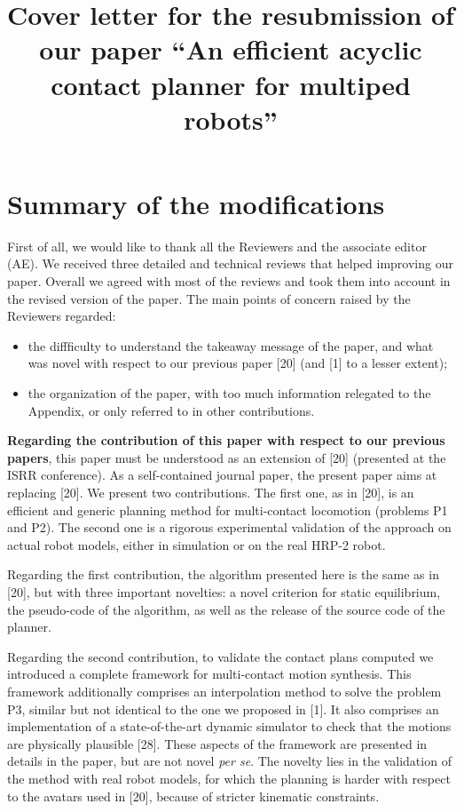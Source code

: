 \documentclass[a4paper]{article}
\author {}
\title {Cover letter for the resubmission of our paper ``An efficient acyclic contact planner for multiped robots''}
\date {}
\begin{document}
\maketitle

\section{Summary of the modifications}

First of all, we would like to thank all the Reviewers and the associate editor (AE).
We received three detailed and technical reviews that helped improving our paper.
Overall we agreed with most of the reviews and took them into account in the revised version of the paper.
The main points of concern raised by the Reviewers regarded:
\begin{itemize}
\item the diffficulty to understand the takeaway message of the paper, and what was novel with respect to our previous paper [20] (and [1] to a lesser extent);
\item the organization of the paper, with too much information relegated to the Appendix, or only referred to in other contributions.
\end{itemize}

\textbf{Regarding the contribution of this paper with respect to our previous papers}, this paper must be understood
as an extension of [20] (presented at the ISRR conference). As a self-contained journal paper, the present paper aims at replacing [20]. We present two contributions. The first one, as in [20], is an efficient and generic planning method for multi-contact locomotion (problems P1 and P2).
The second one is a rigorous experimental validation of the approach on actual robot models, either in simulation or on the real HRP-2 robot.

Regarding the first contribution, the algorithm presented here is the same as in [20], but with three important novelties: a novel criterion for
static equilibrium, the pseudo-code of the algorithm,
as well as  the release of the source code of the planner.

Regarding the second contribution, to validate the contact plans computed we introduced a complete framework for multi-contact motion synthesis. This framework additionally comprises an interpolation method to solve the problem P3, similar but not identical to the one we proposed in [1]. It also comprises an implementation of a state-of-the-art dynamic simulator to check that the motions are physically plausible [28]. These aspects of the framework are presented in details in the paper, but are not novel \textit{per se}. The novelty lies in the validation of the method with real robot models, for which the planning is harder with respect to the avatars used in [20], because of stricter kinematic constraints.
\end{document}
